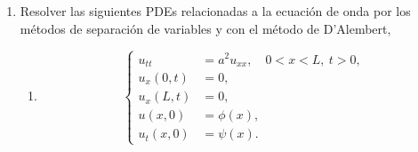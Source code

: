 \documentclass[12pt]{article}
\newcommand{\eej}{\hfill $\square$}
\newcommand{\N}{\mathbb{N}}
\newcommand{\pp}[1]{\left( #1 \right)}
\renewcommand{\a}{\alpha}
\begin{document}
\begin{enumerate}
\begin{enumerate}
\begin{align*}
                   -\frac{4}{\pi(5+2n)}\sin\pp{\tfrac{5+2n}{2}\pi}\\
                &\qquad-\frac{8}{\pi(9-2n)}\sin\pp{\tfrac{9-2n}{2}\pi}
                +\frac{8}{\pi(9+2n)}\sin\pp{\tfrac{9+2n}{2}\pi}\\[4pt]
                &= \frac{4}{(2n-5)\pi}\sin\pp{\tfrac{2n-5}{2}\pi}
                   -\frac{4}{(2n+5)\pi}\sin\pp{\tfrac{2n+5}{2}\pi}\\
                &\qquad-\frac{8}{(2n-9)\pi}\sin\pp{\tfrac{2n-9}{2}\pi}
                +\frac{8}{(2n+9)\pi}\sin\pp{\tfrac{2n+9}{2}\pi}\\[4pt]
                &= \frac{4}{(2n-5)\pi}(-1)^{n+1}
                   +\frac{4}{(2n+5)\pi}(-1)^{n+1}
                   -\frac{8}{(2n-9)\pi}(-1)^{n+1}
                   -\frac{8}{(2n+9)\pi}(-1)^{n+1}\\[4pt]
                &= \frac{4}{\pi}(-1)^{n+1}\pp{\frac{1}{2n-5}+\frac{1}{2n+5}-\frac{2}{2n-9}-\frac{2}{2n+9}}\\[4pt]
                &= \frac{4}{\pi}(-1)^{n+1}\pp{\frac{4n}{4n^2-25}-\frac{16n}{4n^2-81}}\\[4pt]
                &= \frac{16n}{\pi}(-1)^{n+1}\pp{\frac{1}{4n^2-25}-\frac{4}{4n^2-81}}\\[4pt]
                &= \frac{16n}{\pi}(-1)^{n+1}\pp{\frac{4n^2-81-16n^2+100}{(4n^2-25)(4n^2-81)}}\\[4pt]
                &= \frac{16n}{\pi}(-1)^{n+1}\pp{\frac{-12n^2+19}{(4n^2-25)(4n^2-81)}}\\[4pt]
                &= (-1)^{n}\frac{16n(12n^2-19)}{\pi(4n^2-25)(4n^2-81)}.
            \end{align*}
            Por lo tanto,
            \[ u(x,t)=\sum_{n\in\N}(-1)^{n}\frac{16n(12n^2-19)}{\pi(4n^2-25)(4n^2-81)} \sin\pp{\tfrac{n\pi x}{L}}e^{-\pp{\tfrac{\a n\pi}{L}}^2t}.\]
            \eej
        \end{enumerate}
        

        \item Resolver las siguientes PDEs relacionadas a la ecuación de onda por los métodos de separación de variables y con el método de D’Alembert,

        \begin{enumerate}
            \item \[
            \begin{cases}
                u_{tt} &= a^2u_{xx},\quad 0<x<L,~t>0,\\
                u_x(0,t) &= 0,\\
                u_x(L, t) &= 0,\\
                u(x,0) &= \phi(x),\\
                u_t(x,0) &= \psi(x).
            \end{cases}
            \]


\end{enumerate}
\end{enumerate}
\end{document}
